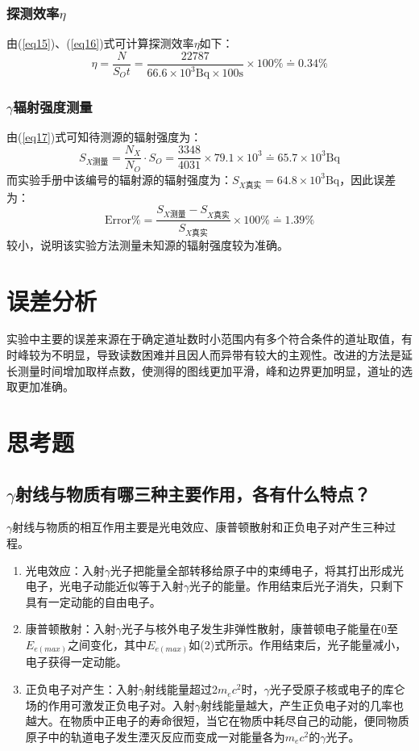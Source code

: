 \documentclass[a4paper]{article}
\begin{document}
\subsubsection{探测效率$\eta$}
由(\ref{eq15})、(\ref{eq16})式可计算探测效率$\eta$如下：
\begin{equation}
\eta = \frac{N}{S_Ot} = \frac{22787}{66.6\times 10^3\text{Bq} \times 100\text{s}}\times 100\% \doteq 0.34\%\label{eta}
\end{equation}
\subsubsection{$\gamma$辐射强度测量}
由(\ref{eq17})式可知待测源的辐射强度为：
\begin{equation}
S_{X\text{测量}} = \frac{N_X}{N_O}\cdot S_O = \frac{3348}{4031}\times 79.1\times 10^3 \doteq 65.7\times 10^3\text{Bq}\label{S_X}
\end{equation}
而实验手册中该编号的辐射源的辐射强度为：$S_{X\text{真实}} = 64.8\times 10^3\text{Bq}$，因此误差为：
\begin{equation}
\text{Error\%} = \frac{S_{X\text{测量}} - S_{X\text{真实}}}{S_{X\text{真实}}}\times 100\% \doteq 1.39\%\label{error}
\end{equation}
较小，说明该实验方法测量未知源的辐射强度较为准确。

\section{误差分析}
实验中主要的误差来源在于确定道址数时小范围内有多个符合条件的道址取值，有时峰较为不明显，导致读数困难并且因人而异带有较大的主观性。改进的方法是延长测量时间增加取样点数，使测得的图线更加平滑，峰和边界更加明显，道址的选取更加准确。

\section{思考题}

\subsection{$\gamma$射线与物质有哪三种主要作用，各有什么特点？}
$\gamma$射线与物质的相互作用主要是光电效应、康普顿散射和正负电子对产生三种过程。
\begin{enumerate}
\item 光电效应：入射$\gamma$光子把能量全部转移给原子中的束缚电子，将其打出形成光电子，光电子动能近似等于入射$\gamma$光子的能量。作用结束后光子消失，只剩下具有一定动能的自由电子。
\item 康普顿散射：入射$\gamma$光子与核外电子发生非弹性散射，康普顿电子能量在0至$E_{e(max)}$之间变化，其中$E_{e(max)}$如(2)式所示。作用结束后，光子能量减小，电子获得一定动能。
\item 正负电子对产生：入射$\gamma$射线能量超过2$m_ec^2$时，$\gamma$光子受原子核或电子的库仑场的作用可激发正负电子对。入射$\gamma$射线能量越大，产生正负电子对的几率也越大。在物质中正电子的寿命很短，当它在物质中耗尽自己的动能，便同物质原子中的轨道电子发生湮灭反应而变成一对能量各为$m_ec^2$的$\gamma$光子。
\end{enumerate}
\end{document}
